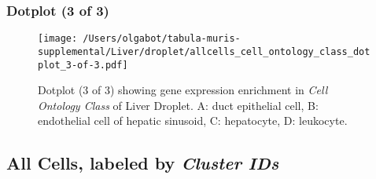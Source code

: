 \clearpage

\subsubsection{Dotplot (3 of 3)}
\begin{figure}[h]
\centering
\texttt{[image: /Users/olgabot/tabula-muris-supplemental/Liver/droplet/allcells\_cell\_ontology\_class\_dotplot\_3-of-3.pdf]}

\caption{ Dotplot (3 of 3)  showing gene expression enrichment in \emph{Cell Ontology Class} of Liver Droplet. A: duct epithelial cell, B: endothelial cell of hepatic sinusoid, C: hepatocyte, D: leukocyte.}
\end{figure}


\clearpage

\subsection{All Cells, labeled by \emph{Cluster IDs}}
